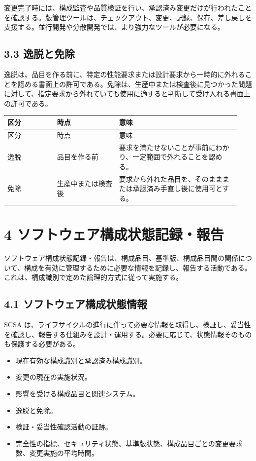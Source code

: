 \documentclass[uplatex,a4paper,11pt]{jsarticle}
\begin{document}
変更完了時には、構成監査や品質検証を行い、承認済み変更だけが行われたことを確認する。版管理ツールは、チェックアウト、変更、記録、保存、差し戻しを支援する。並行開発や分散開発では、より強力なツールが必要になる。

\subsection*{3.3 逸脱と免除}
逸脱は、品目を作る前に、特定の性能要求または設計要求から一時的に外れることを認める書面上の許可である。免除は、生産中または検査後に見つかった問題に対して、指定要求から外れていても使用に適すると判断して受け入れる書面上の許可である。

\begin{longtable}{p{0.20\linewidth}p{0.25\linewidth}p{0.49\linewidth}}\toprule
区分 & 時点 & 意味 \\ \midrule
\endfirsthead\toprule
区分 & 時点 & 意味 \\ \midrule
\endhead
逸脱 & 品目を作る前 & 要求を満たせないことが事前にわかり、一定範囲で外れることを認める。 \\
免除 & 生産中または検査後 & 要求から外れた品目を、そのまままたは承認済み手直し後に使用可とする。 \\
\bottomrule\end{longtable}
\section*{4 ソフトウェア構成状態記録・報告}
ソフトウェア構成状態記録・報告は、構成品目、基準版、構成品目間の関係について、構成を有効に管理するために必要な情報を記録し、報告する活動である。これは、構成識別で定めた論理的方式に従って実施する。

\subsection*{4.1 ソフトウェア構成状態情報}
SCSA は、ライフサイクルの進行に伴って必要な情報を取得し、検証し、妥当性を確認し、報告する仕組みを設計・運用する。必要に応じて、状態情報そのものも保護する必要がある。

\begin{itemize}
\item 現在有効な構成識別と承認済み構成識別。
\item 変更の現在の実施状況。
\item 影響を受ける構成品目と関連システム。
\item 逸脱と免除。
\item 検証・妥当性確認活動の証跡。
\item 完全性の指標、セキュリティ状態、基準版状態、構成品目ごとの変更要求数、変更実施の平均時間。
\end{itemize}
\end{document}
